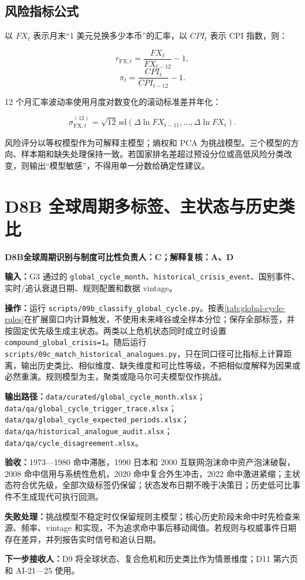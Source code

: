 \documentclass[UTF8,fontset=windows,12pt,openany]{ctexbook}
\newcommand{\Field}[1]{{\small\nolinkurl{#1}}}
\newcommand{\File}[1]{{\small\begingroup\urlstyle{same}\nolinkurl{#1}\endgroup}}
\newcommand{\StepTitle}[3]{%
  \noindent\colorbox{DeepNavy}{\parbox{0.965\textwidth}{\color{white}\Large\bfseries #1\quad #2\hfill\normalsize #3}}\par\medskip
}
\newcommand{\CardRow}[2]{\noindent\textbf{#1：}#2\par}
\begin{document}
\subsection{风险指标公式}

以 \(FX_t\) 表示月末“1 美元兑换多少本币”的汇率，以 \(CPI_t\) 表示 CPI 指数，则：

\begin{equation}
r_{\mathrm{FX},t}=\frac{FX_t}{FX_{t-12}}-1,
\end{equation}
\begin{equation}
\pi_t=\frac{CPI_t}{CPI_{t-12}}-1.
\end{equation}

12 个月汇率波动率使用月度对数变化的滚动标准差并年化：

\begin{equation}
\sigma_{\mathrm{FX},t}^{(12)}=\sqrt{12}\,\mathrm{sd}\!\left(\Delta\ln FX_{t-11},\ldots,\Delta\ln FX_t\right).
\end{equation}

风险评分以等权模型作为可解释主模型；熵权和 PCA 为挑战模型。三个模型的方向、样本期和缺失处理保持一致。若国家排名差超过预设分位或高低风险分类改变，则输出“模型敏感”，不得用单一分数给确定性建议。

\newpage
\section{D8B 全球周期多标签、主状态与历史类比}
\StepTitle{D8B}{全球周期识别与制度可比性}{负责人：C；解释复核：A、D}
\CardRow{输入}{G3 通过的 \Field{global_cycle_month}、\Field{historical_crisis_event}、国别事件、实时/追认衰退日期、规则配置和数据 vintage。}
\CardRow{操作}{运行 \File{scripts/09b_classify_global_cycle.py}。按表\ref{tab:global-cycle-rules}在扩展窗口内计算触发，不使用未来峰谷或全样本分位；保存全部标签，并按固定优先级生成主状态。两类以上危机状态同时成立时设置 \Field{compound_global_crisis=1}。随后运行 \File{scripts/09c_match_historical_analogues.py}，只在同口径可比指标上计算距离，输出历史类比、相似维度、缺失维度和可比性等级，不把相似度解释为因果或必然重演。规则模型为主，聚类或隐马尔可夫模型仅作挑战。}
\CardRow{输出路径}{\File{data/curated/global_cycle_month.xlsx}；\File{data/qa/global_cycle_trigger_trace.xlsx}；\File{data/qa/global_cycle_expected_periods.xlsx}；\File{data/qa/historical_analogue_audit.xlsx}；\File{data/qa/cycle_disagreement.xlsx}。}
\CardRow{验收}{1973—1980 命中滞胀，1990 日本和 2000 互联网泡沫命中资产泡沫破裂，2008 命中信用与系统性危机，2020 命中复合外生冲击，2022 命中激进紧缩；主状态符合优先级，全部次级标签仍保留；状态发布日期不晚于决策日；历史低可比事件不生成现代可执行回测。}
\CardRow{失败处理}{挑战模型不稳定时仅保留规则主模型；核心历史阶段未命中时先检查来源、频率、vintage 和实现，不为追求命中事后移动阈值。若规则与权威事件日期存在差异，并列报告实时信号和追认日期。}
\CardRow{下一步接收人}{D9 将全球状态、复合危机和历史类比作为情景维度；D11 第六页和 AI-21—25 使用。}
\end{document}
